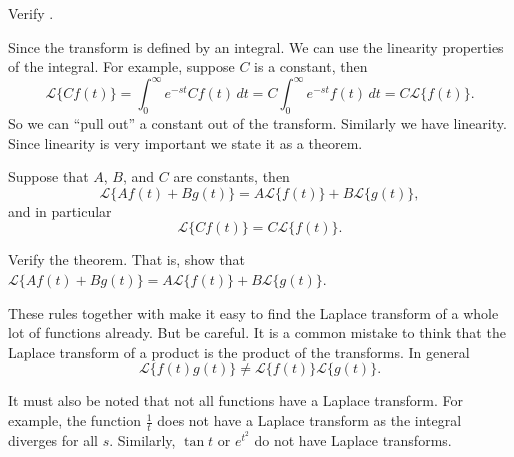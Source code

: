 \documentclass{ximera}
\begin{document}
\begin{exercise}
    Verify .
\end{exercise}

Since the transform is defined by an integral.  We can use the linearity properties of the integral.  For example, suppose $C$ is a constant, then
\begin{equation*}
    \mathcal{L} \bigl\{ C f(t) \bigr\} = \int_0^\infty e^{-st} C f(t) \,dt = C \int_0^\infty e^{-st} f(t) \,dt = C \mathcal{L} \bigl\{ f(t) \bigr\} .
\end{equation*}
So we can ``pull out'' a constant out of the transform.  Similarly  we have linearity. Since linearity is very important we state it as a theorem.

\begin{theorem}
     Suppose that $A$, $B$, and $C$ are constants, then
    \begin{equation*}
        \mathcal{L} \bigl\{ A f(t) + B g(t) \bigr\} = A \mathcal{L} \bigl\{ f(t) \bigr\} + B \mathcal{L} \bigl\{ g(t) \bigr\} ,
    \end{equation*}
    and in particular
    \begin{equation*}
        \mathcal{L} \bigl\{ C f(t) \bigr\} = C \mathcal{L} \bigl\{ f(t) \bigr\} .
    \end{equation*}
\end{theorem}

\begin{exercise}
    Verify the theorem.  That is, show that $\mathcal{L} \bigl\{ A f(t) + B g(t) \bigr\} = A \mathcal{L} \bigl\{ f(t) \bigr\} + B \mathcal{L} \bigl\{ g(t) \bigr\}$.
\end{exercise}

These rules together with  make it easy to find the Laplace transform of a whole lot of functions already. But be careful. It is a common mistake to think that the Laplace transform of a product is the product of the transforms.  In general 
\begin{equation*}
    \mathcal{L} \bigl\{ f(t) g(t) \bigr\} \not= \mathcal{L} \bigl\{ f(t) \bigr\} \mathcal{L} \bigl\{ g(t) \bigr\} .
\end{equation*}

It must also be noted that not all functions have a Laplace transform.  For example, the function $\frac{1}{t}$ does not have a Laplace transform as the integral diverges for all $s$.  Similarly, $\tan t$ or $e^{t^2}$ do not have Laplace transforms.
\end{document}
